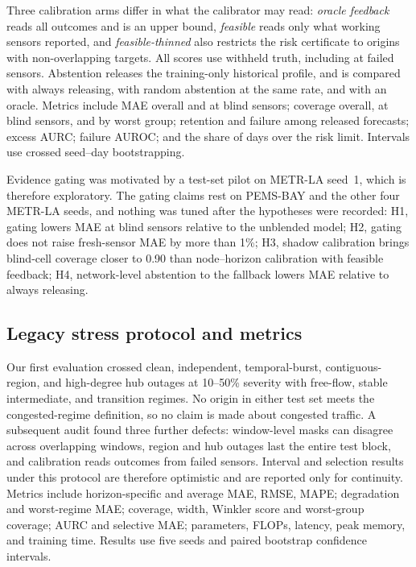 \documentclass[preprint,12pt]{elsarticle}
\begin{document}
Three calibration arms differ in what the calibrator may read: \emph{oracle
feedback} reads all outcomes and is an upper bound, \emph{feasible} reads only
what working sensors reported, and \emph{feasible-thinned} also restricts the
risk certificate to origins with non-overlapping targets. All scores use withheld
truth, including at failed sensors. Abstention releases the training-only
historical profile, and is compared with always releasing, with random abstention
at the same rate, and with an oracle. Metrics include MAE overall and at blind
sensors; coverage overall, at blind sensors, and by worst group; retention and
failure among released forecasts; excess AURC; failure AUROC; and the share of
days over the risk limit. Intervals use crossed seed--day bootstrapping.

Evidence gating was motivated by a test-set pilot on METR-LA seed~1, which is
therefore exploratory. The gating claims rest on PEMS-BAY and the other four
METR-LA seeds, and nothing was tuned after the hypotheses were recorded:
H1, gating lowers MAE at blind sensors relative to the unblended model;
H2, gating does not raise fresh-sensor MAE by more than 1\%;
H3, shadow calibration brings blind-cell coverage closer to 0.90 than
node--horizon calibration with feasible feedback;
H4, network-level abstention to the fallback lowers MAE relative to always
releasing.

\subsection{Legacy stress protocol and metrics}
\label{sec:legacy-protocol}
Our first evaluation crossed clean, independent, temporal-burst,
contiguous-region, and high-degree hub outages at 10--50\% severity with
free-flow, stable intermediate, and transition regimes. No origin in either test
set meets the congested-regime definition, so no claim is made about congested
traffic. A subsequent audit found three further defects: window-level masks can
disagree across overlapping windows, region and hub outages last the entire test
block, and calibration reads outcomes from failed sensors. Interval and selection
results under this protocol are therefore optimistic and are reported only for
continuity. Metrics include horizon-specific and average MAE, RMSE, MAPE;
degradation and worst-regime MAE; coverage, width, Winkler score and worst-group
coverage; AURC and selective MAE; parameters, FLOPs, latency, peak memory, and
training time. Results use five seeds and paired bootstrap confidence
intervals.
\end{document}
